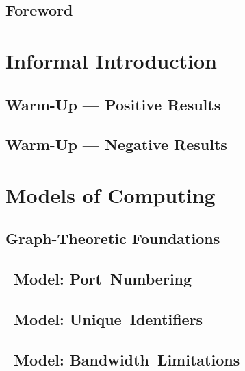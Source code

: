 





\frontmatter
\maketitle
\tableofcontents

\chapter*{Foreword}


\mainmatter
\part{Informal Introduction}

\chapter{Warm-Up --- Positive Results}


\chapter{Warm-Up --- Negative Results}


\part{Models of Computing}

\chapter{Graph-Theoretic Foundations}


\chapter{\tPN{}~Model: Port~Numbering}\label{ch:pn}


\chapter{\tLOCAL{}~Model: Unique~Identifiers}\label{ch:local}


\chapter{\tCONGEST{}~Model: Bandwidth~Limitations}\label{ch:congest}


